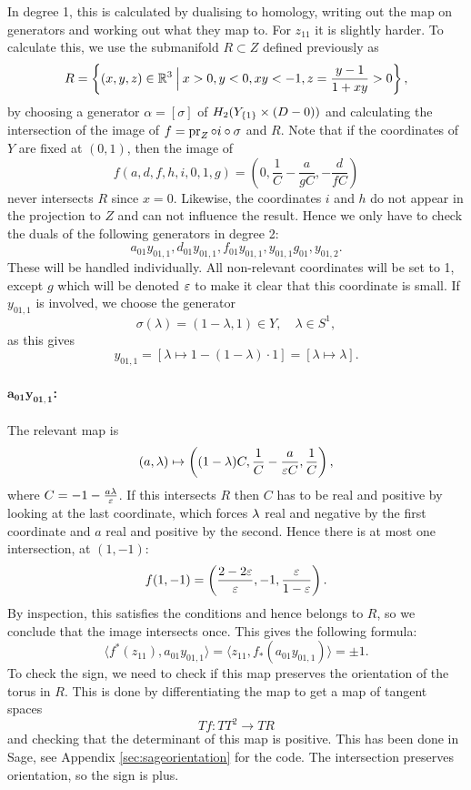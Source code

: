 In degree 1, this is calculated by dualising to homology, writing out
the map on generators and working
out what they map to. For $z_{11}$ it is slightly
harder. To calculate this, we use the submanifold $R \subset Z$
defined previously as
\[ R = \left\{ (x,y,z)\in \mathbb{R}^3 \: \Big\vert\: x > 0, y < 0, xy <
  -1, z = \frac{y-1}{1+xy}>0 \right\}, \]
by choosing a generator $\alpha = [\sigma]$ of $H_2(Y_{\left\{ 1 \right\}}\times
(D-0))$ and calculating the intersection of the image of $f = \operatorname{pr}_Z
\circ i\circ \sigma$ and $R$. Note that if the coordinates of $Y$ are
fixed at $(0,1)$, then the image of
\[ f(a,d,f,h,i,0,1,g) =
\left(0,\frac{1}{C}-\frac{a}{gC},-\frac{d}{fC} \right)\]
never intersects $R$ since $x = 0$. Likewise, the coordinates $i$ and
$h$ do not appear in the projection to $Z$ and can not influence the
result. Hence we only have to check the duals of the following
generators in degree 2:
\[ a_{01} y_{01,1}, d_{01} y_{01,1}, f_{01} y_{01,1}, y_{01,1} g_{01},
y_{01,2}. \]
These will be handled individually. All non-relevant coordinates will
be set to 1, except $g$ which will be denoted $\varepsilon$ to make it clear
that this coordinate is small. If $y_{01,1}$ is involved, we choose the
generator
\[ \sigma(\lambda) = (1-\lambda,1)\in Y, \quad \lambda\in S^1, \]
as this gives
\[ y_{01,1} = [\lambda \mapsto 1-(1-\lambda)\cdot 1] = [\lambda
\mapsto \lambda]. \]

\paragraph{$\mathbf{a_{01} y_{01,1}}$:}
The relevant map is
\[ (a,\lambda) \mapsto \left( (1-\lambda)C, \frac{1}{C}-\frac{a}{\varepsilon
    C},\frac{1}{C}\right), \]
where $C = -1-\frac{a\lambda}{\varepsilon}$. If this intersects $R$ then $C$ has
to be real and positive by looking at the last coordinate, which
forces $\lambda$ real and negative by the first coordinate and $a$ real and
positive by the second. Hence there is at most one intersection, at
$(1,-1)$:
\[ f(1,-1) = \left( \frac{2-2\varepsilon}{\varepsilon},-1,\frac{\varepsilon}{1-\varepsilon}\right). \]
By inspection, this satisfies the conditions and hence belongs to
$R$, so we conclude that the image intersects once. This gives the
following formula:
\[ \langle f^*(z_{11}), a_{01}y_{01,1} \rangle = \langle
z_{11},f_*(a_{01}y_{01,1})\rangle = \pm 1. \]
To check the sign, we need to check if this map preserves the
orientation of the torus in $R$. This is done by differentiating the
map to get a map of tangent spaces
\[ Tf : TT^2 \to TR \]
and checking that the determinant of this map is
positive. This has been done in Sage, see Appendix
\ref{sec:sageorientation} for the code. The intersection preserves
orientation, so the sign is plus.

